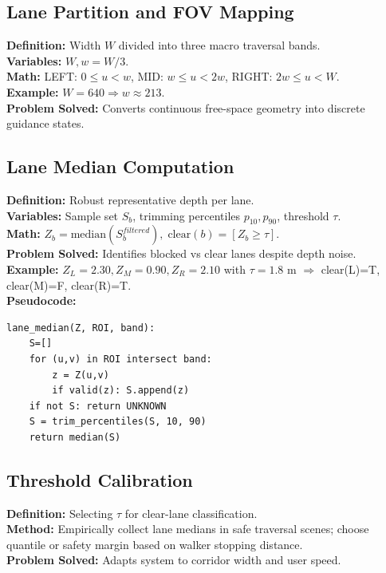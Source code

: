 \documentclass[11pt,a4paper]{article}
\begin{document}
\subsection{Lane Partition and FOV Mapping}
\textbf{Definition:} Width $W$ divided into three macro traversal bands.\\
\textbf{Variables:} $W, w=W/3$.\\
\textbf{Math:} LEFT: $0\le u<w$, MID: $w\le u<2w$, RIGHT: $2w\le u<W$.\\
\textbf{Example:} $W=640\Rightarrow w\approx213$.\\
\textbf{Problem Solved:} Converts continuous free-space geometry into discrete guidance states.

\subsection{Lane Median Computation}
\textbf{Definition:} Robust representative depth per lane.\\
\textbf{Variables:} Sample set $S_b$, trimming percentiles $p_{10},p_{90}$, threshold $\tau$.\\
\textbf{Math:} $Z_b = \mathrm{median}(S_b^{filtered}),\; \text{clear}(b) = [Z_b \ge \tau]$.\\
\textbf{Problem Solved:} Identifies blocked vs clear lanes despite depth noise.\\
\textbf{Example:} $Z_L=2.30, Z_M=0.90, Z_R=2.10$ with $\tau=1.8$ m $\Rightarrow$ clear(L)=T, clear(M)=F, clear(R)=T.\\
\textbf{Pseudocode:}
\begin{lstlisting}[style=code]
lane_median(Z, ROI, band):
    S=[]
    for (u,v) in ROI intersect band:
        z = Z(u,v)
        if valid(z): S.append(z)
    if not S: return UNKNOWN
    S = trim_percentiles(S, 10, 90)
    return median(S)
\end{lstlisting}

\subsection{Threshold Calibration}
\textbf{Definition:} Selecting $\tau$ for clear-lane classification.\\
\textbf{Method:} Empirically collect lane medians in safe traversal scenes; choose quantile or safety margin based on walker stopping distance.\\
\textbf{Problem Solved:} Adapts system to corridor width and user speed.
\end{document}
